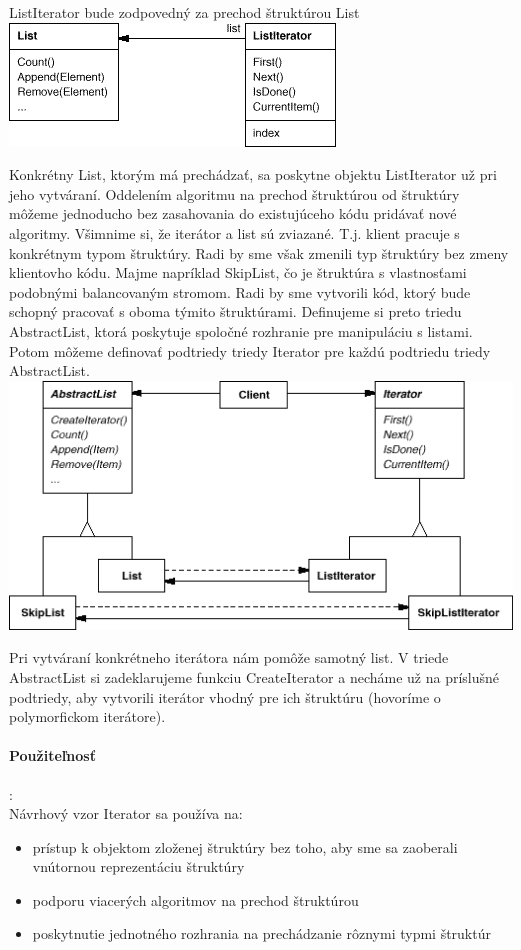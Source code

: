 			ListIterator bude zodpovedný za prechod štruktúrou List\\
				\includegraphics[width=.7\textwidth]{images/programovanie/iterator1}

			Konkrétny List, ktorým má prechádzať, sa poskytne objektu ListIterator už pri jeho vytváraní. Oddelením algoritmu na prechod štruktúrou od štruktúry môžeme jednoducho bez zasahovania do existujúceho kódu pridávať nové algoritmy. Všimnime si, že iterátor a list sú zviazané. T.j. klient pracuje s konkrétnym typom štruktúry. Radi by sme však zmenili typ štruktúry bez zmeny klientovho kódu. Majme napríklad SkipList, čo je štruktúra s vlastnosťami podobnými balancovaným stromom. Radi by sme vytvorili kód, ktorý bude schopný pracovať s oboma týmito štruktúrami. Definujeme si preto triedu AbstractList, ktorá poskytuje spoločné rozhranie pre manipuláciu s listami. Potom môžeme definovať podtriedy triedy Iterator pre každú podtriedu triedy AbstractList.\\

				\includegraphics[width=.9\textwidth]{images/programovanie/iterator2}

			Pri vytváraní konkrétneho iterátora nám pomôže samotný list. V triede AbstractList si zadeklarujeme funkciu CreateIterator a necháme už na príslušné podtriedy, aby vytvorili iterátor vhodný pre ich štruktúru (hovoríme o polymorfickom iterátore).

			\paragraph{Použiteľnosť}:\\
			Návrhový vzor Iterator sa používa na:
				\begin{itemize}
					\item prístup k objektom zloženej štruktúry bez toho, aby sme sa zaoberali vnútornou reprezentáciu štruktúry
					\item podporu viacerých algoritmov na prechod štruktúrou
					\item poskytnutie jednotného rozhrania na prechádzanie rôznymi typmi štruktúr
				\end{itemize}
